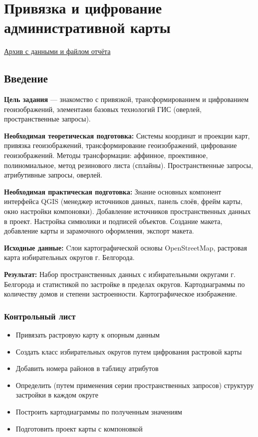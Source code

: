 \documentclass[
  12pt,
]{book}
\providecommand{\tightlist}{%
  \setlength{\itemsep}{0pt}\setlength{\parskip}{0pt}}
\begin{document}
\hypertarget{map-ref-districts}{%
\chapter{Привязка и цифрование административной карты}\label{map-ref-districts}}

\href{https://1drv.ms/u/s!AmtmZDq3JgxHgZUEDiSdZeUQ-2U9dw?e=kBWcAM}{Архив с данными и файлом отчёта}

\hypertarget{map-ref-districts-intro}{%
\section{Введение}\label{map-ref-districts-intro}}

\textbf{Цель задания} --- знакомство с привязкой, трансформированием и цифрованием геоизображений, элементами базовых технологий ГИС (оверлей, пространственные запросы).

\textbf{Необходимая теоретическая подготовка:} Системы координат и проекции карт, привязка геоизображений, трансформирование геоизображений, цифрование геоизображений. Методы трансформации: аффинное, проективное, полиномиальное, метод резинового листа (сплайны). Пространственные запросы, атрибутивные запросы, оверлей.

\textbf{Необходимая практическая подготовка:} Знание основных компонент интерфейса QGIS (менеджер источников данных, панель слоёв, фрейм карты, окно настройки компоновки). Добавление источников пространственных данных в проект. Настройка символики и подписей объектов. Создание макета, добавление карты и зарамочного оформления, экспорт макета.

\textbf{Исходные данные:} Cлои картографической основы OpenStreetMap, растровая карта избирательных округов г. Белгорода.

\textbf{Результат:} Набор пространственных данных с избирательными округами г. Белгорода и статистикой по застройке в пределах округов. Картодиаграммы по количеству домов и степени застроенности. Картографическое изображение.

\hypertarget{map-ref-economic-control}{%
\subsection{Контрольный лист}\label{map-ref-economic-control}}

\begin{itemize}
\tightlist
\item
  Привязать растровую карту к опорным данным
\item
  Создать класс избирательных округов путем цифрования растровой карты
\item
  Добавить номера районов в таблицу атрибутов
\item
  Определить (путем применения серии пространственных запросов) структуру застройки в каждом округе
\item
  Построить картодиаграммы по полученным значениям
\item
  Подготовить проект карты с компоновкой
\end{itemize}
\end{document}
